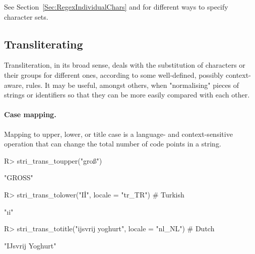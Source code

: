 \documentclass[nojss]{jss}
\begin{document}
See Section~\ref{Sec:RegexIndividualChars}
and 
for different ways to specify character sets.





\subsection{Transliterating}

Transliteration, in its broad sense, deals with the substitution
of characters or their groups for different ones, according to some
well-defined, possibly context-aware, rules.
It may be useful, amongst others, when "normalising"
pieces of strings or identifiers so that they can be more easily
compared with each other.


\paragraph{Case mapping.}
Mapping to  upper, lower, or title case
is a language- and context-sensitive operation
that can change the total number of code points in a string.



\begin{Schunk}
\begin{Sinput}
R> stri_trans_toupper("groß")
\end{Sinput}
\begin{Soutput}
[1] "GROSS"
\end{Soutput}
\begin{Sinput}
R> stri_trans_tolower("Iİ", locale = "tr_TR")               # Turkish
\end{Sinput}
\begin{Soutput}
[1] "ıi"
\end{Soutput}
\begin{Sinput}
R> stri_trans_totitle("ijsvrij yoghurt", locale = "nl_NL")  # Dutch
\end{Sinput}
\begin{Soutput}
[1] "IJsvrij Yoghurt"
\end{Soutput}
\end{Schunk}




\end{document}
